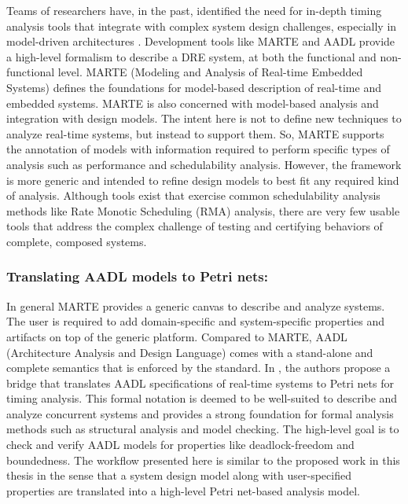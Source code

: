 Teams of researchers have, in the past, identified the need for in-depth timing analysis tools that integrate with complex system design challenges, especially in model-driven architectures \cite{kordon_sn}. Development tools like MARTE \cite{MARTE:05} and AADL \cite{AADL_Intro:06} provide a high-level formalism to describe a DRE system, at both the functional and non-functional level. MARTE (Modeling and Analysis of Real-time Embedded Systems) defines the foundations for model-based description of real-time and embedded systems. MARTE is also concerned with model-based analysis and integration with design models. The intent here is not to define new techniques to analyze real-time systems, but instead to support them. So, MARTE supports the annotation of models with information required to perform specific types of analysis such as performance and schedulability analysis. However, the framework is more generic and intended to refine design models to best fit any required kind of analysis. Although tools exist that exercise common schedulability analysis methods like Rate Monotic Scheduling (RMA) analysis, there are very few usable tools that address the complex challenge of testing and certifying behaviors of complete, composed systems. 

\subsubsection{Translating AADL models to Petri nets: }

In general MARTE provides a generic canvas to describe and analyze systems. The user is required to add domain-specific and system-specific properties and artifacts on top of the generic platform. Compared to MARTE, AADL (Architecture Analysis and Design Language) comes with a stand-alone and complete semantics that is enforced by the standard. In \cite{kordon_sn}, the authors propose a bridge that translates AADL specifications of real-time systems to Petri nets for timing analysis. This formal notation is deemed to be well-suited to describe and analyze concurrent systems and provides a strong foundation for formal analysis \cite{girault2013petri} methods such as structural analysis and model checking. The high-level goal is to check and verify AADL models for properties like deadlock-freedom and boundedness. The workflow presented here is similar to the proposed work in this thesis in the sense that a system design model along with user-specified properties are translated into a high-level Petri net-based analysis model. 

